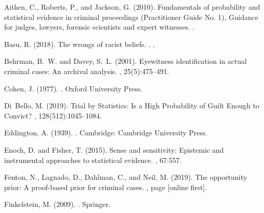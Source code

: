 \documentclass{article}
\begin{document}
\begin{thebibliography}{}

Aitken, C., Roberts, P., and Jackson, G. (2010).
\newblock Fundamentals of probability and statistical evidence in criminal
  proceedings ({P}ractitioner {G}uide {N}o. 1), {G}uidance for judges, lawyers,
  forensic scientists and expert witnesses.
.

Basu, R. (2018).
\newblock The wrongs of racist beliefs.
.
\newblock [forthcoming].

Behrman, B.~W. and Davey, S.~L. (2001).
\newblock Eyewitness identification in actual criminal cases: {{An}} archival
  analysis.
, 25(5):475--491.

Cohen, J. (1977).
.
\newblock Oxford University Press.

Di~Bello, M. (2019).
\newblock Trial by {{Statistics}}: {{Is}} a {{High Probability}} of {{Guilt
  Enough}} to {{Convict}}?
, 128(512):1045--1084.

Eddington, A. (1939).
.
\newblock Cambridge: Cambridge University Press.

Enoch, D. and Fisher, T. (2015).
\newblock Sense and sensitivity: Epistemic and instrumental approaches to
  statistical evidence.
, 67:557.

Fenton, N., Lagnado, D., Dahlman, C., and Neil, M. (2019).
\newblock The opportunity prior: A proof-based prior for criminal cases.
, page [online first].

Finkelstein, M. (2009).
.
\newblock Springer.


\end{thebibliography}
\end{document}
